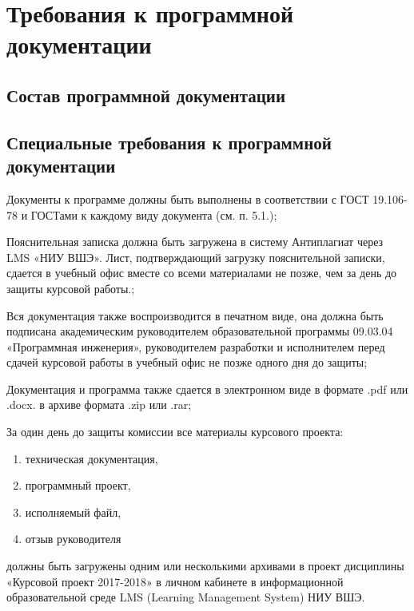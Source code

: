 \section{Требования к программной документации}

\subsection{Состав программной документации}



\subsection{Специальные требования к программной документации}

Документы к программе должны быть выполнены в соответствии с ГОСТ 19.106-78 и ГОСТами к каждому виду документа (см. п. 5.1.);

Пояснительная записка должна быть загружена в систему Антиплагиат через LMS «НИУ ВШЭ».
Лист, подтверждающий загрузку пояснительной записки, сдается в учебный офис вместе со всеми материалами не позже, чем за день до защиты курсовой работы.;

Вся документация также воспроизводится в печатном виде, она должна быть подписана академическим руководителем образовательной программы 09.03.04 «Программная инженерия», руководителем разработки и исполнителем перед сдачей курсовой работы в учебный офис не позже одного дня до защиты;

Документация и программа также сдается в электронном виде в формате .pdf или .docx. в архиве формата .zip или .rar;

За один день до защиты комиссии все материалы курсового проекта:
\begin{enumerate}
    \item техническая документация,
    \item программный проект,
    \item исполняемый файл,
    \item отзыв руководителя
\end{enumerate}
должны быть загружены одним или несколькими архивами в проект дисциплины «Курсовой проект 2017-2018» в личном кабинете в информационной образовательной среде LMS (Learning Management System) НИУ ВШЭ.